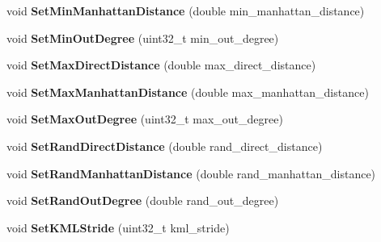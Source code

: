 \begin{DoxyCompactItemize}
\item 
void {\bfseries Set\+Min\+Manhattan\+Distance} (double min\+\_\+manhattan\+\_\+distance)\hypertarget{classconfig_1_1Config_a56494955c7f063ce4e7ef7267d27bd7b}{}\label{classconfig_1_1Config_a56494955c7f063ce4e7ef7267d27bd7b}

\item 
void {\bfseries Set\+Min\+Out\+Degree} (uint32\+\_\+t min\+\_\+out\+\_\+degree)\hypertarget{classconfig_1_1Config_ad76100effbd17b4d41d7c6e8eda981ef}{}\label{classconfig_1_1Config_ad76100effbd17b4d41d7c6e8eda981ef}

\item 
void {\bfseries Set\+Max\+Direct\+Distance} (double max\+\_\+direct\+\_\+distance)\hypertarget{classconfig_1_1Config_acfb5170d27647255d25a9351ee2fbfeb}{}\label{classconfig_1_1Config_acfb5170d27647255d25a9351ee2fbfeb}

\item 
void {\bfseries Set\+Max\+Manhattan\+Distance} (double max\+\_\+manhattan\+\_\+distance)\hypertarget{classconfig_1_1Config_a4f1d9b592d7ebe2f0854908ab4103bd3}{}\label{classconfig_1_1Config_a4f1d9b592d7ebe2f0854908ab4103bd3}

\item 
void {\bfseries Set\+Max\+Out\+Degree} (uint32\+\_\+t max\+\_\+out\+\_\+degree)\hypertarget{classconfig_1_1Config_affc7348e8d6dc5345a16aec834c922fa}{}\label{classconfig_1_1Config_affc7348e8d6dc5345a16aec834c922fa}

\item 
void {\bfseries Set\+Rand\+Direct\+Distance} (double rand\+\_\+direct\+\_\+distance)\hypertarget{classconfig_1_1Config_ae930bbbeceadeff475462a06abccd6ac}{}\label{classconfig_1_1Config_ae930bbbeceadeff475462a06abccd6ac}

\item 
void {\bfseries Set\+Rand\+Manhattan\+Distance} (double rand\+\_\+manhattan\+\_\+distance)\hypertarget{classconfig_1_1Config_a1b23450a87b656f0bcd8e7bc9cf69f1a}{}\label{classconfig_1_1Config_a1b23450a87b656f0bcd8e7bc9cf69f1a}

\item 
void {\bfseries Set\+Rand\+Out\+Degree} (double rand\+\_\+out\+\_\+degree)\hypertarget{classconfig_1_1Config_a56dd390504ae7e631e62cdcc6d0a2c39}{}\label{classconfig_1_1Config_a56dd390504ae7e631e62cdcc6d0a2c39}

\item 
void {\bfseries Set\+K\+M\+L\+Stride} (uint32\+\_\+t kml\+\_\+stride)\hypertarget{classconfig_1_1Config_a79f87e32daf0312fbc5399b9acf22068}{}\label{classconfig_1_1Config_a79f87e32daf0312fbc5399b9acf22068}


\end{DoxyCompactItemize}
